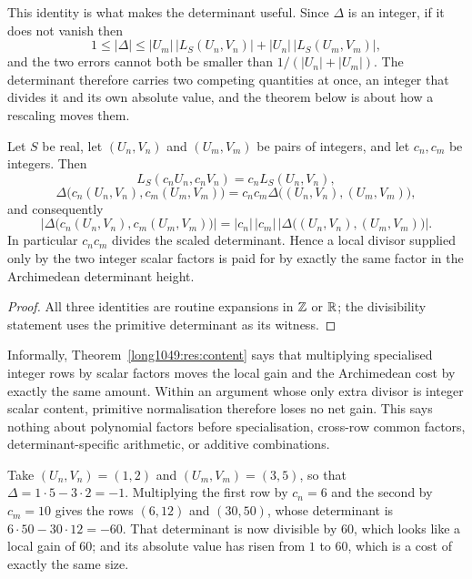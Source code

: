 \documentclass[11pt]{article}
\begin{document}
This identity is what makes the determinant useful.  Since \(\Delta\) is an
integer, if it does not vanish then
\[
 1\le|\Delta|
  \le|U_m|\,\bigl|L_S(U_n,V_n)\bigr|+|U_n|\,\bigl|L_S(U_m,V_m)\bigr|,
\]
and the two errors cannot both be smaller than
\(1/(|U_n|+|U_m|)\).  The determinant therefore carries two competing
quantities at once, an integer that divides it and its own absolute value, and
the theorem below is about how a rescaling moves them.

\begin{theorem}\label{long1049:res:content}
Let \(S\) be real, let \((U_n,V_n)\) and \((U_m,V_m)\) be pairs of integers, and
let \(c_n,c_m\) be integers.  Then
\[
 L_S(c_nU_n,c_nV_n)=c_nL_S(U_n,V_n),
\]
\[
 \Delta\bigl(c_n(U_n,V_n),c_m(U_m,V_m)\bigr)
 =c_nc_m\Delta\bigl((U_n,V_n),(U_m,V_m)\bigr),
\]
and consequently
\[
 \left|\Delta\bigl(c_n(U_n,V_n),c_m(U_m,V_m)\bigr)\right|
 =|c_n|\,|c_m|\,
   \left|\Delta\bigl((U_n,V_n),(U_m,V_m)\bigr)\right|.
\]
In particular \(c_nc_m\) divides the scaled determinant.  Hence a local
divisor supplied only by the two integer scalar factors is paid for by exactly
the same factor in the Archimedean determinant height.
\end{theorem}

\begin{proof}
All three identities are routine expansions in \(\mathbb{Z}\) or \(\mathbb{R}\); the
divisibility statement uses the primitive determinant as its witness.
\end{proof}

Informally, Theorem~\ref{long1049:res:content} says that multiplying specialised integer
rows by scalar factors moves the local gain and the Archimedean cost by exactly
the same amount.  Within an argument whose only extra divisor is integer scalar
content, primitive normalisation therefore loses no net gain.  This says
nothing about polynomial factors before specialisation, cross-row common
factors, determinant-specific arithmetic, or additive combinations.

\begin{example}\label{long1049:ex:content}
Take \((U_n,V_n)=(1,2)\) and \((U_m,V_m)=(3,5)\), so that
\(\Delta=1\cdot5-3\cdot2=-1\).  Multiplying the first row by \(c_n=6\) and the
second by \(c_m=10\) gives the rows \((6,12)\) and \((30,50)\), whose
determinant is \(6\cdot50-30\cdot12=-60\).  That determinant is now divisible
by \(60\), which looks like a local gain of \(60\); and its absolute value has
risen from \(1\) to \(60\), which is a cost of exactly the same size.
\end{example}
\end{document}
